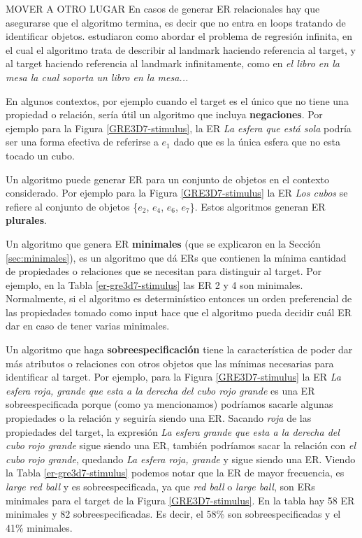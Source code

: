 MOVER A OTRO LUGAR
En casos de generar ER relacionales hay que asegurarse que el algoritmo termina, es decir que no entra en loops tratando de identificar objetos. \cite{haddock} estudiaron como abordar el problema de regresi\'on infinita, en el cual el algoritmo trata de describir al landmark haciendo referencia al target, y al target haciendo referencia al landmark infinitamente, como en {\it el libro en la mesa la cual soporta un libro en la mesa... }

En algunos contextos, por ejemplo cuando el target es el \'unico que no tiene una propiedad o relaci\'on, ser\'ia \'util un algoritmo que incluya {\bf negaciones}. Por ejemplo para la Figura \ref{GRE3D7-stimulus}, la ER {\it La esfera que est\'a sola} podr\'ia ser 
una forma efectiva de referirse a $e_1$ dado que es la \'unica esfera que no esta tocado un cubo.

Un algoritmo puede generar ER para un conjunto de objetos en el contexto considerado. Por ejemplo para la Figura \ref{GRE3D7-stimulus} la ER {\it Los cubos} se refiere al conjunto de objetos \{$e_2$, $e_4$, $e_6$, $e_7$\}. Estos algoritmos generan ER {\bf plurales}.

Un algoritmo que genera ER {\bf minimales} (que se explicaron en la Secci\'on \ref{sec:minimales}), es un algoritmo que d\'a ERs que contienen la m\'inima cantidad de propiedades o relaciones que se necesitan para distinguir al target. Por ejemplo, en la Tabla \ref{er-gre3d7-stimulus} las ER 2 y 4 son minimales. Normalmente, si el algoritmo es determin\'istico entonces un orden preferencial de las propiedades tomado como input hace que el algoritmo pueda decidir cu\'al ER dar en caso de tener varias minimales.

Un algoritmo que haga {\bf sobreespecificaci\'on} tiene la caracter\'istica de poder dar m\'as atributos o relaciones con otros objetos que las m\'inimas necesarias para identificar al target. Por ejemplo, para la Figura \ref{GRE3D7-stimulus} la ER {\it La esfera roja, grande que esta a la derecha del cubo rojo grande} es una ER sobreespecificada porque (como ya mencionamos) podr\'iamos sacarle algunas propiedades o la relaci\'on y seguir\'ia siendo una ER. Sacando {\it roja} de las propiedades del target, la expresi\'on {\it La esfera grande que esta a la derecha del cubo rojo grande} sigue siendo una ER, tambi\'en podr\'iamos sacar la relaci\'on con {\it el cubo rojo grande}, quedando {\it La esfera roja, grande} y sigue siendo una ER. Viendo la Tabla \ref{er-gre3d7-stimulus} podemos notar que la ER de mayor frecuencia, es {\it large red ball} y es sobreespecificada, ya que {\it red ball} o {\it large ball}, son ERs minimales para el target de la Figura \ref{GRE3D7-stimulus}. En la tabla hay 58 ER minimales y 82 sobreespecificadas. Es decir, el 58\% son sobreespecificadas y el 41\% minimales.

